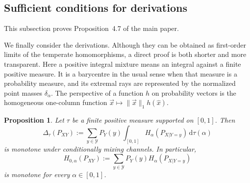\documentclass[aps,pra,11pt,onecolumn,nofootinbib,tightenlines]{revtex4-2}
\newtheorem{proposition}[theorem]{Proposition}
\theoremstyle{definition}
\begin{document}
\subsection{Sufficient conditions for derivations}

This subsection proves Proposition~4.7 of the main paper.

We finally consider the derivations. Although they can be obtained as first-order limits of the temperate homomorphisms, a direct proof is both shorter and more transparent.
Here a positive integral mixture means an integral against a finite positive
measure.  It is a barycentre in the usual sense when that measure is a
probability measure, and its extremal rays are represented by the normalized
point masses $\delta_\alpha$.  The
perspective of a function $h$ on probability vectors is the homogeneous
one-column function $\vec x\mapsto\|\vec x\|_1h(\widehat x)$.

\begin{proposition}
\label{prop:derivation-sufficient}
Let $\tau$ be a finite positive measure supported on $[0,1]$. Then
\begin{equation}
 \Delta_\tau(P_{XY})
 :=\sum_{y\in\mathcal Y}P_Y(y)
   \int_{[0,1]}H_\alpha(P_{X|Y=y})\,\mathrm d\tau(\alpha)
 \label{eq:general-derivation-barycentre}
\end{equation}
 is monotone under conditionally mixing channels. In particular,
\begin{equation}
 H_{0,\alpha}(P_{XY})
 :=\sum_{y\in\mathcal Y}P_Y(y)H_\alpha(P_{X|Y=y})
 \label{eq:extremal-derivation}
\end{equation}
 is monotone for every $\alpha\in[0,1]$.
\end{proposition}
\end{document}
